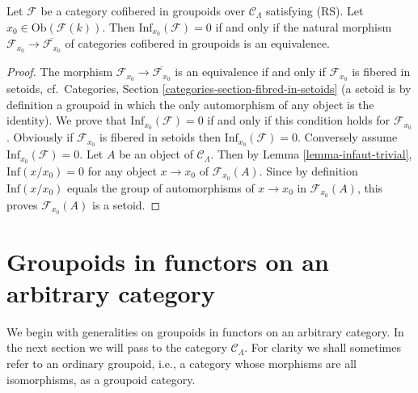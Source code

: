 \begin{lemma}
\label{lemma-infdef-trivial}
Let $\mathcal{F}$ be a category cofibered in groupoids over $\mathcal 
C_\Lambda$ satisfying (RS). Let $x_0 \in \text{Ob}(\mathcal{F}(k))$. 
Then $\text{Inf}_{x_0}(\mathcal{F}) = 0$ if and only if the natural 
morphism $\mathcal{F}_{x_0} \to \overline{\mathcal{F}_{x_0}}$ of 
categories cofibered in groupoids is an equivalence.
\end{lemma}

\begin{proof}
The morphism $\mathcal{F}_{x_0} \to \overline{\mathcal{F}_{x_0}}$ is an 
equivalence if and only if $\mathcal{F}_{x_0}$ is fibered in setoids,
cf.\ Categories, Section \ref{categories-section-fibred-in-setoids}
(a setoid is by definition a groupoid in 
which the only automorphism of any object is the identity).  We prove that 
$\text{Inf}_{x_0}(\mathcal{F}) = 0$ if and only if this condition holds 
for $\mathcal{F}_{x_0}$.  Obviously if $\mathcal{F}_{x_0}$ is fibered in
setoids 
then $\text{Inf}_{x_0}(\mathcal{F}) = 0$.  Conversely assume 
$\text{Inf}_{x_0}(\mathcal{F}) = 0$.  Let $A$ be an object of $\mathcal 
C_\Lambda$. Then by Lemma \ref{lemma-infaut-trivial}, 
$\text{Inf}(x/x_0) = 0$ for any object $x \to x_0$ of $\mathcal 
F_{x_0}(A)$. Since by definition $\text{Inf}(x/x_0)$ equals the group of 
automorphisms of $x \to x_0$ in $\mathcal{F}_{x_0}(A)$, this proves 
$\mathcal{F}_{x_0}(A)$ is a setoid.
\end{proof}






\section{Groupoids in functors on an arbitrary category}
\label{section-groupoids-arbitrary}

\noindent
We begin with generalities on groupoids in functors on an
arbitrary category. In the next section we will
pass to the category $\mathcal{C}_\Lambda$.
For clarity we shall sometimes refer to an ordinary groupoid,
i.e., a category whose morphisms are all isomorphisms, as a groupoid category.

